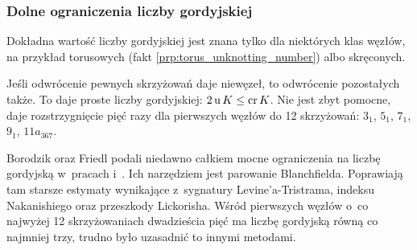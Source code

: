 
\subsubsection{Dolne ograniczenia liczby gordyjskiej}
Dokładna wartość liczby gordyjskiej jest znana tylko dla niektórych klas węzłów, na przykład torusowych (fakt \ref{prp:torus_unknotting_number}) albo skręconych.
%
%

Jeśli odwrócenie pewnych skrzyżowań daje niewęzeł, to odwrócenie pozostałych także.
To daje proste liczby gordyjskiej: $2 \operatorname{u} K \le \operatorname{cr} K$.
Nie jest zbyt pomocne, daje rozstrzygnięcie pięć razy dla pierwszych węzłów do 12 skrzyżowań: $3_{1}$, $5_{1}$, $7_{1}$, $9_{1}$, $11a_{367}$.

Borodzik oraz Friedl podali niedawno całkiem mocne ograniczenia na liczbę gordyjską w~pracach \cite{borodzik14} i~\cite{borodzik15}.
%
%
Ich narzędziem jest parowanie Blanchfielda.
%
Poprawiają tam starsze estymaty wynikające z~sygnatury Levine'a-Tristrama, indeksu Nakanishiego oraz przeszkody Lickorisha.
%
%
%
Wśród pierwszych węzłów o~co najwyżej 12 skrzyżowaniach dwadzieścia pięć ma liczbę gordyjską równą co najmniej trzy, trudno było uzasadnić to innymi metodami.

